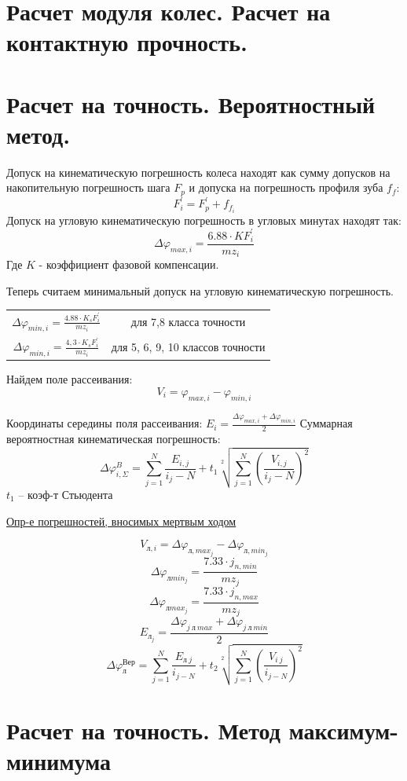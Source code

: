 \documentclass{article}
\begin{document}
\begin{multicols}{3}
\section {\tiny Расчет модуля колес. Расчет на контактную прочность.}

\section {\tiny Расчет на точность. Вероятностный метод.}

Допуск на кинематическую погрешность колеса находят как сумму допусков на накопительную
погрешность шага $F_p$ и допуска на погрешность профиля зуба $f_f$:
$$
F_i^{'} = F_p^{'} + f_{f_i}
$$
Допуск на угловую кинематическую погрешность в угловых минутах находят так:
$$
\Delta \varphi_{max, i} = \frac{6.88 \cdot K F_i^{'}}{m z_i} 
$$
Где $K$ - коэффициент фазовой компенсации.

Теперь считаем минимальный допуск на угловую кинематическую погрешность.

\begin{tabular}{cc}
$ \Delta \varphi_{min,i} = \frac{4.88 \cdot K_s F_i^{'}}{m z_i} $ & для 7,8 класса точности \\
$ \Delta \varphi_{min,i} = \frac{4,3 \cdot K_s F_i^{'}}{m z_i} $  & для 5, 6, 9, 10 классов точности
\end{tabular}

Найдем поле рассеивания:
$$
V_i = \varphi_{max, i} - \varphi_{min, i}
$$

Координаты середины поля рассеивания: $E_i = \frac{ \Delta \varphi_{max, i} + \Delta \varphi_{min, i}}{2} $
Суммарная вероятностная кинематическая погрешность:
$$
\Delta \varphi_{i, \Sigma}^{B} = \sum\limits_{j = 1}^{N} \frac{E_{i,j}}{i_j - N} + t_1 \sqrt[2]{\sum\limits_{j = 1}^{N} \left(\frac{V_{i,j}}{i_j - N}\right)^2}
$$
$t_1$ -- коэф-т Стьюдента

\underline{Опр-е погрешностей, вносимых мертвым ходом} 

$$
V_{л, i} = \Delta \varphi_{л, max_j} - \Delta \varphi_{л, min_j}
$$
$$
\Delta \varphi_{л min_j} = \frac{7.33 \cdot j_{n, min}}{m z_j} 
$$
$$
\Delta \varphi_{л max_j} = \frac{7.33 \cdot j_{n, max}}{m z_j} 
$$
$$
E_{л_j} = \frac{ \Delta \varphi_{j \: л \: max} + \Delta \varphi_{j \: л \: min}}{2}
$$
$$
\Delta \varphi_{л}^{Вер} = \sum\limits_{j = 1}^{N} \frac{E_{л \: j}}{i_{j - N}} + t_2 \sqrt[2]{\sum\limits_{j = 1}^{N} \left(\frac{V_{i \: j}}{i_{j - N}} \right)^2}
$$

\section {\tiny Расчет на точность. Метод максимум-минимума}


\end{multicols}
\end{document}
